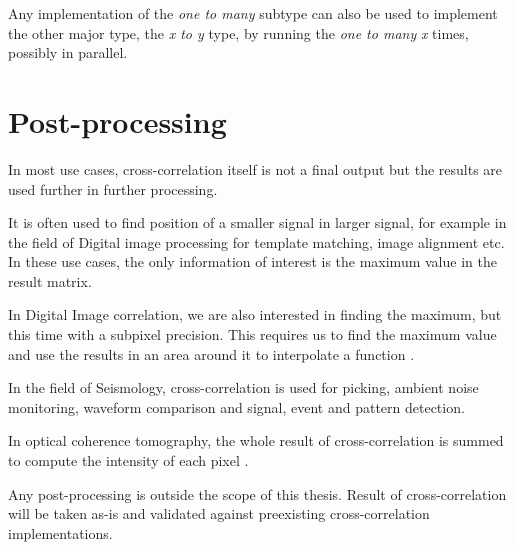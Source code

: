 Any implementation of the \textit{one to many} subtype can also be used to implement the other major type, the \textit{x to y} type, by running the \textit{one to many} \textit{x} times, possibly in parallel.




\section{Post-processing}

In most use cases, cross-correlation itself is not a final output but the results are used further in further processing.

It is often used to find position of a smaller signal in larger signal, for example in the field of Digital image processing for template matching, image alignment etc. In these use cases, the only information of interest is the maximum value in the result matrix. 

In Digital Image correlation, we are also interested in finding the maximum, but this time with a subpixel precision. This requires us to find the maximum value and use the results in an area around it to interpolate a function \citep{zhang2015} \citep{misko}.

In the field of Seismology, cross-correlation is used for picking, ambient noise monitoring, waveform comparison and signal, event and pattern detection. \citep{Ventosa2019}
 
In optical coherence tomography, the whole result of cross-correlation is summed to compute the intensity of each pixel \citep{Kapinchev2015}. 

Any post-processing is outside the scope of this thesis. Result of cross-correlation will be taken as-is and validated against preexisting cross-correlation implementations.


